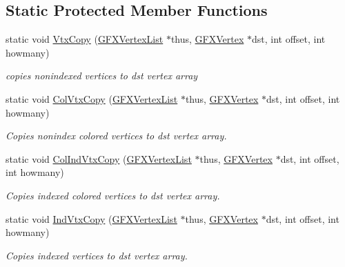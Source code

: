 \subsection*{Static Protected Member Functions}
\begin{DoxyCompactItemize}
\item 
static void \hyperlink{classGFXVertexList_a50cd52a8a59f2b99ecfbb9cfb66c1d8a}{Vtx\+Copy} (\hyperlink{classGFXVertexList}{G\+F\+X\+Vertex\+List} $\ast$thus, \hyperlink{structGFXVertex}{G\+F\+X\+Vertex} $\ast$dst, int offset, int howmany)\hypertarget{classGFXVertexList_a50cd52a8a59f2b99ecfbb9cfb66c1d8a}{}\label{classGFXVertexList_a50cd52a8a59f2b99ecfbb9cfb66c1d8a}

\begin{DoxyCompactList}\small\item\em copies nonindexed vertices to dst vertex array \end{DoxyCompactList}\item 
static void \hyperlink{classGFXVertexList_a51596d25644bb93d46d923c5a3422278}{Col\+Vtx\+Copy} (\hyperlink{classGFXVertexList}{G\+F\+X\+Vertex\+List} $\ast$thus, \hyperlink{structGFXVertex}{G\+F\+X\+Vertex} $\ast$dst, int offset, int howmany)\hypertarget{classGFXVertexList_a51596d25644bb93d46d923c5a3422278}{}\label{classGFXVertexList_a51596d25644bb93d46d923c5a3422278}

\begin{DoxyCompactList}\small\item\em Copies nonindex colored vertices to dst vertex array. \end{DoxyCompactList}\item 
static void \hyperlink{classGFXVertexList_a6fc0c87585b9d5765b03ef8a21378f75}{Col\+Ind\+Vtx\+Copy} (\hyperlink{classGFXVertexList}{G\+F\+X\+Vertex\+List} $\ast$thus, \hyperlink{structGFXVertex}{G\+F\+X\+Vertex} $\ast$dst, int offset, int howmany)\hypertarget{classGFXVertexList_a6fc0c87585b9d5765b03ef8a21378f75}{}\label{classGFXVertexList_a6fc0c87585b9d5765b03ef8a21378f75}

\begin{DoxyCompactList}\small\item\em Copies indexed colored vertices to dst vertex array. \end{DoxyCompactList}\item 
static void \hyperlink{classGFXVertexList_a091b1a0152e67f664d5bb58dcb772600}{Ind\+Vtx\+Copy} (\hyperlink{classGFXVertexList}{G\+F\+X\+Vertex\+List} $\ast$thus, \hyperlink{structGFXVertex}{G\+F\+X\+Vertex} $\ast$dst, int offset, int howmany)\hypertarget{classGFXVertexList_a091b1a0152e67f664d5bb58dcb772600}{}\label{classGFXVertexList_a091b1a0152e67f664d5bb58dcb772600}

\begin{DoxyCompactList}\small\item\em Copies indexed vertices to dst vertex array. \end{DoxyCompactList}\end{DoxyCompactItemize}
